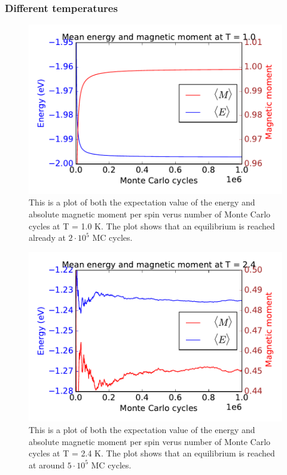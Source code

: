 \subsubsection{Different temperatures}
\begin{figure}[H]
\includegraphics[width=\linewidth]{../results/4c/En_mag_T1_0}\caption{This is a plot of both the expectation value of the energy and absolute magnetic moment per spin verus number of Monte Carlo cycles at T = 1.0 K. The plot shows that an equilibrium is reached already at $2 \cdot 10^{5}$ MC cycles.}\label{fig:L_20_energy_mag_T_1.0}
\end{figure}

\begin{figure}[H]
\includegraphics[width=\linewidth]{../results/4c/En_mag_T2_4}\caption{This is a plot of both the expectation value of the energy and absolute magnetic moment per spin verus number of Monte Carlo cycles at T = 2.4 K. The plot shows that an equilibrium is reached at around $5 \cdot 10^{5}$ MC cycles.}\label{fig:L_20_energy_mag_T_2.4}
\end{figure}


